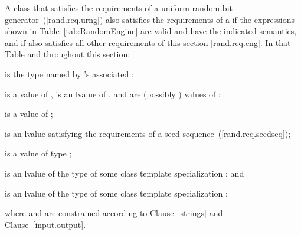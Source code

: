 \pnum
A class 
that satisfies the requirements
of a uniform random bit generator~(\ref{rand.req.urng})
also satisfies the requirements
of a 
if the expressions shown
in Table~\ref{tab:RandomEngine}
are valid and have the indicated semantics,
and if  also satisfies all other requirements
of this section \ref{rand.req.eng}.
In that Table and throughout this section:
\begin{enumeratea}
  \item
     is the type named by
    's associated ;
  \item
     is a value of ,
     is an lvalue of ,
     and  are (possibly ) values of ;
  \item
     is a value of ;
  \item
     is an lvalue
    satisfying the requirements of a seed sequence~(\ref{rand.req.seedseq});
  \item
     is a value
    of type ;
  \item
     is an lvalue of the type of some class template specialization
     ;
  and
  \item
     is an lvalue of the type of some class template specialization
     ;
\end{enumeratea}
where  and  are constrained
according to Clause~\ref{strings} and Clause~\ref{input.output}.

